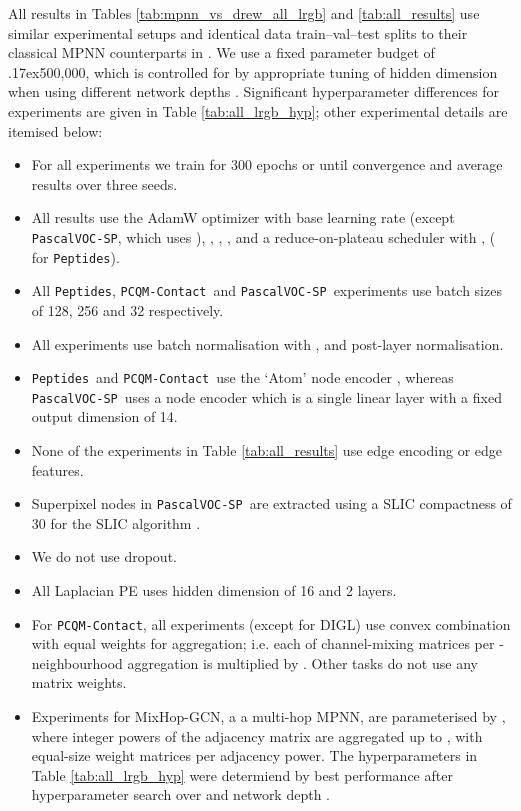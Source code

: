 \documentclass{article}
\newcommand{\mytilde}{\raise.17ex\hbox{}}
\newcommand{\peptides}{\texttt{Peptides}}
\newcommand{\pcqm}{\texttt{PCQM-Contact}}
\newcommand{\voc}{\texttt{PascalVOC-SP}}
\theoremstyle{plain}
\theoremstyle{definition}
\theoremstyle{remark}
\begin{document}
All results in Tables \ref{tab:mpnn_vs_drew_all_lrgb} and \ref{tab:all_results} use similar experimental setups and identical data train--val--test splits to their classical MPNN counterparts in \citet{dwivedi2022long}. We use a fixed parameter budget of \mytilde500,000, which is controlled for by appropriate tuning of hidden dimension when using different network depths .
Significant hyperparameter differences for experiments are given in Table \ref{tab:all_lrgb_hyp}; other experimental details are itemised below:
\begin{itemize}
    \item For all experiments we train for 300 epochs or until convergence and average results over three seeds.
    \item All results use the AdamW optimizer \cite{kingma2017adam, loshchilov2017decoupled} with base learning rate  (except \texttt{PascalVOC-SP}, which uses ), ,
    ,
    ,
    and a reduce-on-plateau scheduler with ,   ( for \peptides).
    \item All \peptides, \pcqm\ and \voc\ experiments use batch sizes of 128, 256 and 32 respectively.
    \item All experiments use batch normalisation with ,  and post-layer  normalisation.
    \item \peptides\ and \pcqm\ use the `Atom' node encoder \cite{hu2020open, hu2021ogb}, whereas \voc\ uses a node encoder which is a single linear layer with a fixed output dimension of 14.
    \item None of the experiments in Table \ref{tab:all_results} use edge encoding or edge features.
    \item Superpixel nodes in \voc\ are extracted using a SLIC compactness of 30 for the SLIC algorithm \cite{achanta2012slic}.
    \item We do not use dropout.
    \item All Laplacian PE uses hidden dimension of 16 and 2 layers.
    \item For \pcqm, all experiments (except for DIGL) use convex combination with equal weights for aggregation; i.e. each of  channel-mixing matrices per -neighbourhood aggregation is multiplied by . Other tasks do not use any matrix weights.
    \item Experiments for MixHop-GCN, a a multi-hop MPNN, are parameterised by ,  where integer powers of the adjacency matrix are aggregated up to , with equal-size weight matrices per adjacency power. The hyperparameters in Table \ref{tab:all_lrgb_hyp} were determiend by best performance after hyperparameter search over  and network depth .

\end{itemize}
\end{document}
